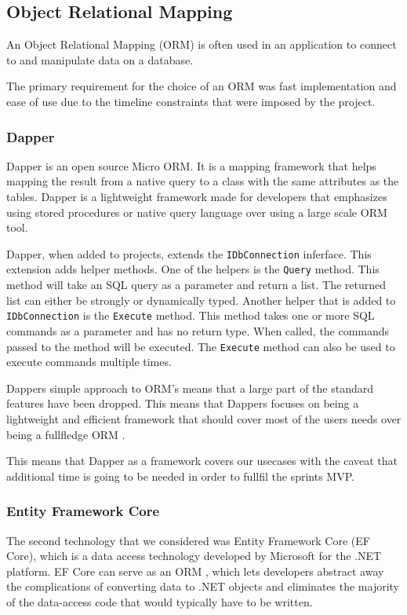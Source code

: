 \subsection{Object Relational Mapping}
An Object Relational Mapping (ORM) is often used in an application to connect to and manipulate data on a database.

The primary requirement for the choice of an ORM was fast implementation and ease of use due to the timeline constraints that were imposed by the \knox{} project. 

\subsubsection{Dapper}
Dapper is an open source Micro ORM. It is a mapping framework that helps mapping the result from a native query to a class with the same attributes as the tables. Dapper is a lightweight framework made for developers that emphasizes using stored procedures or native query language over using a large scale ORM tool. 


Dapper, when added to projects, extends the \texttt{IDbConnection} inferface. This extension adds helper methods. 
One of the helpers is the \texttt{Query} method. This method will take an SQL query as a parameter and return a list. The returned list can either be strongly or dynamically typed.
Another helper that is added to \texttt{IDbConnection} is the \texttt{Execute} method. This method takes one or more SQL commands as a parameter and has no return type. When called, the commands passed to the method will be executed. The \texttt{Execute} method can also be used to execute commands multiple times\cite{Dapper_Git}.

Dappers simple approach to ORM's means that a large part of the standard features have been dropped. This means that Dappers focuses on being a lightweight and efficient framework that should cover most of the users needs over being a fullfledge ORM \cite{Dapper_Git}.

This means that Dapper as a framework covers our usecases with the caveat that additional time is going to be needed in order to fullfil the sprints MVP. 

\subsubsection{Entity Framework Core}
The second technology that we considered was Entity Framework Core (EF Core), which is a data access technology developed by Microsoft for the .NET platform. EF Core can serve as an ORM \cite{Object_relational_mapping}, which lets developers abstract away the complications of converting data to .NET objects and eliminates the majority of the data-access code that would typically have to be written.

